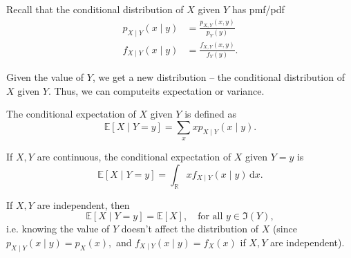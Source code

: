 Recall that the conditional distribution of \(X\) given \(Y\) has pmf/pdf
\begin{align*}
    p_{X \mid Y} (x \mid y) &= \frac{p_{X, Y} (x, y)}{p_Y(y)} \\
    f_{X \mid Y} (x \mid y) &= \frac{f_{X, Y} (x, y)}{f_Y(y)}.
\end{align*}  

Given the value of \(Y\), we get a new distribution -- the conditional distribution of \(X\) given \(Y\). Thus, we can computeits expectation or variance. 

\begin{definition}
    The conditional expectation of \(X\) given \(Y\) is defined as 
    \[
        \mathbb{E} \left[ X \mid Y = y \right] = \sum_{x} x p_{X \mid Y}(x \mid y).  
    \]  
\end{definition}

\begin{definition}
    If \(X, Y\) are continuous, the conditional expectation of \(X\) given \(Y = y\) is 
    \[
        \mathbb{E} [X \mid Y = y] = \int _{\mathbb{R}} x f_{X \mid Y} (x \mid y) \, \mathrm{d} x. 
    \]   
\end{definition}

\begin{remark}
    If \(X, Y\) are independent, then 
    \[
        \mathbb{E} [X \mid Y = y] = \mathbb{E} [X], \quad \text{for all } y \in \Im (Y), 
    \] 
    i.e. knowing the value of \(Y\) doesn't affect the distribution of \(X\) (since \(p_{X \mid Y}(x \mid y) = p_X(x),\) and \(f_{X \mid Y}(x \mid y) = f_X(x)\) if \(X, Y\) are independent).  
\end{remark}

